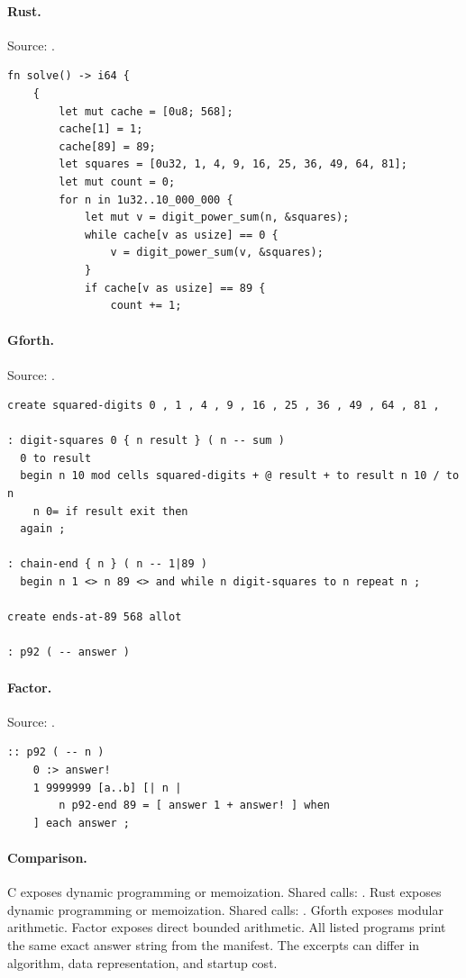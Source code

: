 \paragraph{Rust.} Source: .
\begin{lstlisting}
fn solve() -> i64 {
    {
        let mut cache = [0u8; 568];
        cache[1] = 1;
        cache[89] = 89;
        let squares = [0u32, 1, 4, 9, 16, 25, 36, 49, 64, 81];
        let mut count = 0;
        for n in 1u32..10_000_000 {
            let mut v = digit_power_sum(n, &squares);
            while cache[v as usize] == 0 {
                v = digit_power_sum(v, &squares);
            }
            if cache[v as usize] == 89 {
                count += 1;
\end{lstlisting}

\paragraph{Gforth.} Source: .
\begin{lstlisting}
create squared-digits 0 , 1 , 4 , 9 , 16 , 25 , 36 , 49 , 64 , 81 ,

: digit-squares 0 { n result } ( n -- sum )
  0 to result
  begin n 10 mod cells squared-digits + @ result + to result n 10 / to n
    n 0= if result exit then
  again ;

: chain-end { n } ( n -- 1|89 )
  begin n 1 <> n 89 <> and while n digit-squares to n repeat n ;

create ends-at-89 568 allot

: p92 ( -- answer )
\end{lstlisting}

\paragraph{Factor.} Source: .
\begin{lstlisting}
:: p92 ( -- n )
    0 :> answer!
    1 9999999 [a..b] [| n |
        n p92-end 89 = [ answer 1 + answer! ] when
    ] each answer ;
\end{lstlisting}

\paragraph{Comparison.}
C exposes dynamic programming or memoization. Shared calls: \texttt{}. Rust exposes dynamic programming or memoization. Shared calls: \texttt{}. Gforth exposes modular arithmetic. Factor exposes direct bounded arithmetic.
All listed programs print the same exact answer string from the manifest. The excerpts can differ in algorithm, data representation, and startup cost.

